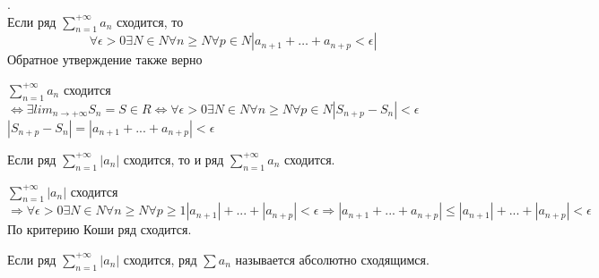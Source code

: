 \begin{Th}.\\
	Если ряд $\sum^{+\infty}_{n=1}a_n$ сходится, то
    \[
        \forall \epsilon > 0 \exists N \in N \forall n \geq N \forall p \in N |a_{n+1} + \dots + a_{n+p} < \epsilon|
    \]
    Обратное утверждение также верно
\end{Th}

\begin{Proof}
	$\sum^{+\infty}_{n=1}a_n$ сходится $\Leftrightarrow \exists lim_{n \rightarrow +\infty}S_n = S \in R \Leftrightarrow \forall \epsilon > 0 \exists N \in N \forall n \geq N \forall p \in N |S_{n+p} - S_n| < \epsilon$\\
	$|S_{n+p}-S_n| = |a_{n+1} + ... + a_{n+p}| < \epsilon$\\
\end{Proof}

\begin{Th}
	Если ряд $\sum^{+\infty}_{n=1}|a_n|$ сходится, то и ряд $\sum^{+\infty}_{n=1}a_n$ сходится.
\end{Th}

\begin{Proof}
	$\sum^{+\infty}_{n=1}|a_n|$ сходится $\Rightarrow \forall \epsilon > 0 \exists N \in N \forall n \geq N \forall p \geq 1 |a_{n+1}| + ... + |a_{n+p}| < \epsilon \Rightarrow |a_{n+1} + ... + a_{n+p}| \leq |a_{n+1}| + ... + |a_{n+p}| < \epsilon$\\
	По критерию Коши ряд сходится.\\
\end{Proof}

\begin{Def}
	Если ряд $\sum^{+\infty}_{n=1}|a_n|$ сходится, ряд $\sum a_n$ называется абсолютно сходящимся.
\end{Def}